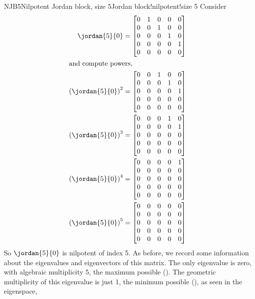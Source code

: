 \begin{example}{NJB5}{Nilpotent Jordan block, size 5}{Jordan block!nilpotent!size 5}
Consider
%
\begin{align*}
%
\jordan{5}{0}&=
\begin{bmatrix}
0 & 1 & 0 & 0 & 0\\
0 & 0 & 1 & 0 & 0\\
0 & 0 & 0 & 1 & 0\\
0 & 0 & 0 & 0 & 1\\
0 & 0 & 0 & 0 & 0
\end{bmatrix}\\
%
\intertext{and compute powers,}
%
\left(\jordan{5}{0}\right)^2&=
\begin{bmatrix}
 0 & 0 & 1 & 0 & 0 \\
 0 & 0 & 0 & 1 & 0 \\
 0 & 0 & 0 & 0 & 1 \\
 0 & 0 & 0 & 0 & 0 \\
 0 & 0 & 0 & 0 & 0
\end{bmatrix}\\
%
\left(\jordan{5}{0}\right)^3&=
\begin{bmatrix}
 0 & 0 & 0 & 1 & 0 \\
 0 & 0 & 0 & 0 & 1 \\
 0 & 0 & 0 & 0 & 0 \\
 0 & 0 & 0 & 0 & 0 \\
 0 & 0 & 0 & 0 & 0
\end{bmatrix}\\
%
\left(\jordan{5}{0}\right)^4&=
\begin{bmatrix}
 0 & 0 & 0 & 0 & 1 \\
 0 & 0 & 0 & 0 & 0 \\
 0 & 0 & 0 & 0 & 0 \\
 0 & 0 & 0 & 0 & 0 \\
 0 & 0 & 0 & 0 & 0
\end{bmatrix}\\
%
\left(\jordan{5}{0}\right)^5&=
\begin{bmatrix}
 0 & 0 & 0 & 0 & 0 \\
 0 & 0 & 0 & 0 & 0 \\
 0 & 0 & 0 & 0 & 0 \\
 0 & 0 & 0 & 0 & 0 \\
 0 & 0 & 0 & 0 & 0
\end{bmatrix}\\
%
\end{align*}
%
So $\jordan{5}{0}$ is nilpotent of index 5.  As before, we record some information about the eigenvalues and eigenvectors of this matrix.  The only eigenvalue is zero, with algebraic multiplicity 5, the maximum possible ().  The geometric multiplicity of this eigenvalue is just 1, the minimum possible (), as seen in the eigenspace, 

\end{example}
